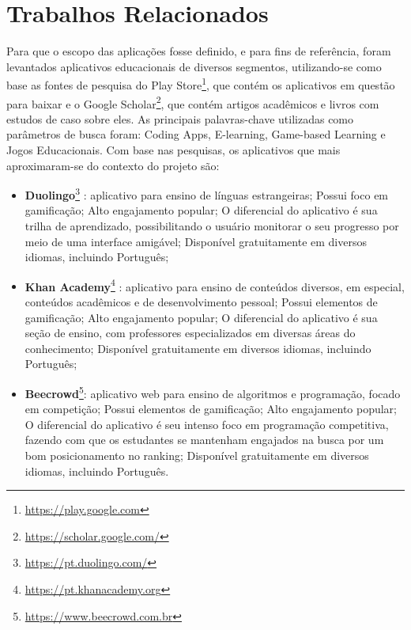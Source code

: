 \section{Trabalhos Relacionados}
Para que o escopo das aplicações fosse definido, e para fins de referência, foram levantados aplicativos educacionais de diversos segmentos, utilizando-se como base as fontes de pesquisa do Play Store\footnote{\url{https://play.google.com}}, que contém os aplicativos em questão para baixar e o Google Scholar\footnote{\url{https://scholar.google.com/}}, que contém artigos acadêmicos e livros com estudos de caso sobre eles. As principais palavras-chave utilizadas como parâmetros de busca foram: Coding Apps, E-learning, Game-based Learning e Jogos Educacionais. Com base nas pesquisas, os aplicativos que mais aproximaram-se do contexto do projeto são:

\begin{itemize}
  \item \textbf{Duolingo}\footnote{\url{https://pt.duolingo.com/}} \cite{duolingo}: aplicativo para ensino de línguas estrangeiras; Possui foco em gamificação; Alto engajamento popular; O diferencial do aplicativo é sua trilha de aprendizado, possibilitando o usuário monitorar o seu progresso por meio de uma interface amigável; Disponível gratuitamente em diversos idiomas, incluindo Português;
  \item \textbf{Khan Academy}\footnote{\url{https://pt.khanacademy.org}} \cite{khan_academy}: aplicativo para ensino de conteúdos diversos, em especial, conteúdos acadêmicos e de desenvolvimento pessoal; Possui elementos de gamificação; Alto engajamento popular; O diferencial do aplicativo é sua seção de ensino, com professores especializados em diversas áreas do conhecimento; Disponível gratuitamente em diversos idiomas, incluindo Português;
  \item \textbf{Beecrowd}\footnote{\url{https://www.beecrowd.com.br}}: aplicativo web para ensino de algoritmos e programação, focado em competição; Possui elementos de gamificação; Alto engajamento popular; O diferencial do aplicativo é seu intenso foco em programação competitiva, fazendo com que os estudantes se mantenham engajados na busca por um bom posicionamento no ranking; Disponível gratuitamente em diversos idiomas, incluindo Português.
\end{itemize}

